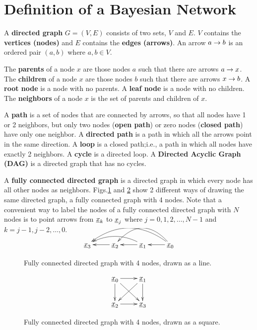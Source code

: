 \chapter*{Definition of a Bayesian Network}

\label{ch-bnet-def}

A {\bf directed graph} $G=(V,E)$
consists of two sets, $V$
and $E$. $V$ contains
the {\bf vertices (nodes)}
and $E$ contains the {\bf edges (arrows)}.
An arrow $a\rightarrow b$ is an
ordered pair 
$(a,b)$ where $a, b\in V$.

The {\bf parents} 
of a node $x$ are 
those nodes $a$
such that there are arrows 
$a\rightarrow x$.
The {\bf children} of a node
$x$
are those nodes $b$
such that there are arrows $x\rightarrow b$.
A {\bf root node}
is a node with no parents.
A {\bf leaf node}
is a node with no children.
The {\bf neighbors}
of a node $x$
is the set of parents and 
children of $x$.

A {\bf path} is a 
set of nodes that 
are connected 
by arrows, so 
that all nodes
have 1 or 2 neighbors,
but only two nodes ({\bf open path})
or zero nodes ({\bf closed path})
have only one neighbor.
A {\bf directed path}
is a path in
which all the arrows point
in the same direction.
A {\bf loop}
is a closed path;i.e.,
a path in which all
nodes have exactly 2 neighbors.
A {\bf cycle} is a directed loop.
A {\bf Directed Acyclic Graph (DAG)}
is a directed graph that has no
cycles. 


A {\bf fully connected directed graph}
is 
a directed graph
in which 
every node has all other 
nodes as neighbors.
Figs.\ref{fig-full-conn-4-line}
and
\ref{fig-full-conn-4-square}
show 2 different
ways of drawing
the same directed graph,
a fully connected graph with 4 nodes.
Note that a convenient
way
to label
the nodes of a fully
connected directed
graph
with $N$ nodes
is to point
arrows
from 
${\underline{x}}_k$ to ${\underline{x}}_j$
where $j=0, 1, 2,\ldots, N-1$
and 
$k=j-1, j-2, \ldots, 0$.


\begin{figure}[h!]
$$
\xymatrix{
\rvx_3
&\rvx_2\ar[l]
&\rvx_1\ar[l]\ar@/_1pc/[ll]
&\rvx_0\ar[l]\ar@/_2pc/[ll]\ar@/_2pc/[lll]
}
$$
\caption{Fully 
connected directed  graph with 4 nodes,
drawn as a line.}
\label{fig-full-conn-4-line}
\end{figure}

\begin{figure}[h!]
$$
\xymatrix{
\rvx_0\ar[r]\ar[d]\ar[rd]&\rvx_1\ar[d]\ar[ld]
\\
\rvx_2\ar[r]&\rvx_3
}
$$
\caption{Fully 
connected directed  graph with 4 nodes,
drawn as a square.}
\label{fig-full-conn-4-square}
\end{figure}

